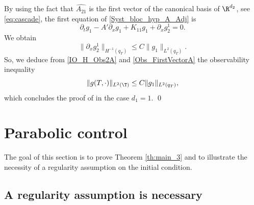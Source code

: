 By using the fact that $\widehat{A_{21}}$ is the first vector of the canonical basis of $\R^{d_2}$, see \eqref{eq:cascade}, the first equation of \eqref{Syst_bloc_hyp_A_Adj} is
\[
\partial_t g_1 - A' \partial_{x} g_1 + K_{11} g_1 + \partial_{x} g_2^{1} = 0.
\]
We obtain
\begin{equation}
\label{Obs_FirstVectorA}
\|\partial_{x} g_2^1\|_{H^{-1}(q_T)} \leq C \| g_1\|_{L^2(q_T)}.
\end{equation}
So, we deduce from \eqref{IO_H_Obs2A} and \eqref{Obs_FirstVectorA} the observability inequality
\[
\| g(T,\cdot) \|_{L^2(\T)} \leq C \| g_1\|_{L^2(q_T)},
\]
which concludes the proof of  in the case $d_1=1$. \qed

\section{Parabolic control} \label{Sec:Par}

The goal of this section is to prove Theorem \ref{th:main_3} and to illustrate the necessity of a regularity assumption on the initial condition.

\subsection{A regularity assumption is necessary}

